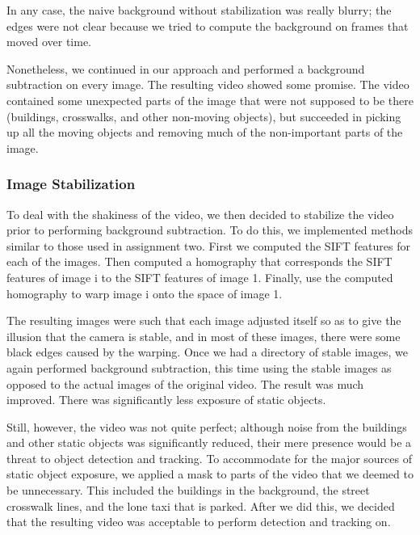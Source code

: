 \documentclass[a4paper, 10pt, conference]{ieeeconf}      %
\begin{document}
In any case, the naive background without stabilization was really blurry; the edges were not clear because we tried to compute the background on frames that moved over time. \newline

Nonetheless, we continued in our approach and performed a background subtraction on every image. The resulting video showed some promise. The video contained some unexpected parts of the image that were not supposed to be there (buildings, crosswalks, and other non-moving objects), but succeeded in picking up all the moving objects and removing much of the non-important parts of the image. \newline


\subsubsection{Image Stabilization}

To deal with the shakiness of the video, we then decided to stabilize the video prior to performing background subtraction. To do this, we implemented methods similar to those used in assignment two. First we computed the SIFT features for each of the images. Then computed a homography that corresponds the SIFT features of image i to the SIFT features of image 1. Finally, use the computed homography to warp image i onto the space of image 1. \newline

The resulting images were such that each image adjusted itself so as to give the illusion that the camera is stable, and in most of these images, there were some black edges caused by the warping. Once we had a directory of stable images, we again performed background subtraction, this time using the stable images as opposed to the actual images of the original video. The result was much improved. There was significantly less exposure of static objects. \newline

Still, however, the video was not quite perfect; although noise from the buildings and other static objects was significantly reduced, their mere presence would be a threat to object detection and tracking. To accommodate for the major sources of static object exposure, we applied a mask to parts of the video that we deemed to be unnecessary. This included the buildings in the background, the street crosswalk lines, and the lone taxi that is parked. After we did this, we decided that the resulting video was acceptable to perform detection and tracking on.\newline
\end{document}
